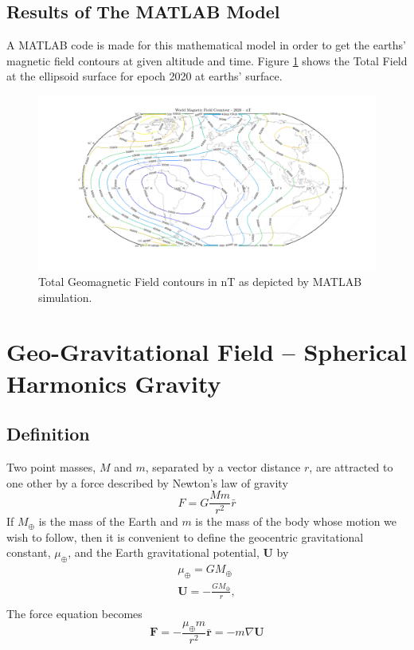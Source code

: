 \subsection{Results of The MATLAB Model}
A MATLAB code is made for this mathematical model in order to get the earths' magnetic field contours at given altitude and time. 
Figure \ref{fig:res} shows the Total Field at the ellipsoid surface for epoch 2020 at earths' surface.
\begin{figure}[H]
    \centering
    \includegraphics[width = \textwidth]{Figures/total_mag_field_2020.png}
    \caption{Total Geomagnetic Field contours in nT as depicted by MATLAB simulation.}
    \label{fig:res}
\end{figure}

\section{Geo-Gravitational Field -- Spherical Harmonics Gravity}
\subsection{Definition}
Two point masses, $M$ and $m$, separated by a vector distance $r$, are attracted to one other by a force described by Newton's law of gravity
\begin{equation}
    F=G \frac{M m}{r^{2}} \bar{r}
\end{equation}
If $M_{\oplus}$ is the mass of the Earth and $m$ is the mass of the body whose motion we wish to follow, then it is convenient to define the geocentric gravitational constant, $\mu_{\oplus}$, and the Earth gravitational potential, $\boldsymbol{U}$ by
\begin{equation*}
\begin{gathered}
\mu_{\oplus}=G M_{\oplus} \\
\boldsymbol{U}=-\frac{G M_{\oplus}}{r}, \\
\end{gathered}
\end{equation*}
The force equation becomes
\begin{equation}
    \boldsymbol{F}=-\frac{\mu_{\oplus} m}{r^{2}}\bar{\boldsymbol{r}}=-m \nabla \boldsymbol{U}
\end{equation}
